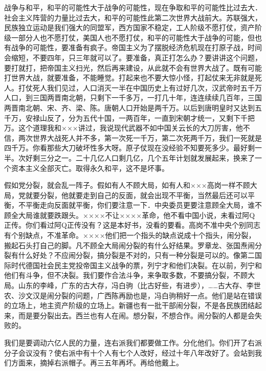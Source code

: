 战争与和平，和平的可能性大于战争的可能性，现在争取和平的可能性比过去大．社会主义阵营的力量比过去大，和平的可能性此第二次世界大战前大。苏联强大，民族独立运动是我们强大的同盟军，西方国家不稳定，工人阶级不愿打仗，资产阶级一部分人也不愿打仗，美国人也不愿打仗，和平的可能性大于战争的可能，但也有战争的可能性，要准备有疯子。帝国主义为了摆脱经济危机现在打原子战，时间会缩短，不要四年，只三年就可以了。要准备，真正打怎么办？要讲讲这个问题，要打就打，把帝国主义扫光，然后再来建设，从此就不会有世界大战了。既有可能打世界大战，就要准备，不能睡觉。打起来也不要大惊小怪，打起仗来无非就是死人。打仗死人我们见过，人口消灭一半在中国历史上有过好几次，汉武帝时五千万人口，到三国两晋南北朝，只剩下一千多万，一打几十年，连连续续几百年，三国两晋南北朝、宋、齐、梁、陈。唐朝人口开始是两千万。以后到唐明皇时又达到五千万，安禄山反了，分为五代十国，一两百年，一直到宋朝才统一，又剩下千把万。这个道理我和×××讲过，我说现代武器不如中国关云长的大刀厉害，他不信，两次世界大战死人并不多，第一次死一千万，第二次死两千万，我们一死就是四千万。你看那些大刀破坏性多大呀。原子仗现在没经验不知要死多少。最好剩一半。次好剩三分之一。二十几亿人口剩几亿，几个五年计划就发展起来，换来了一个资本主义全部灭亡。取得永久和平，这不是坏事。

假如党分裂，就会乱一阵子。假如有人不顾大局，如有人和×××高岗一样不顾大局，党就要分裂，他就要走到自己的反面，就会出现不平衡，当然最后还可以平衡，不平衡走向反面就平衡，你们要注意一下．中央委员更要注意顾全大局，谁不顾全大局谁就要跌跟头。××××不让××××革命，他不看中国小说，未看过阿Q正传。你们看过阿Q正传没有？这是本好书，没看的要看。高岗不准中央个别同志有个别缺点，不准革命。××××他们把一个指头的缺点说成十个指头，闹分裂，搬起石头打自己的脚。凡不顾全大局闹分裂的有什么好结果。罗章龙、张国焘闹分裂有什么好处？不应闹分裂，搞分裂是不对的，只有一种分裂是可以的。像第二国际时代德国社会民主党投帝国主义战争的票，列宁才和他们决裂。在以前，列宁和他们有斗争，但不决裂。我们要作合法斗争，来争取多数，不要搞分裂，不顾大局。山东的李峰，广东的古大存，冯白驹（比古好些，有进步），……古大存、李世农、沙文汉是闹分裂的问题，广西陈再励也是，冯白驹稍好一点。他们是站在错误的立场上，地主资产阶级的立场上。新疆也有一批干部闹分裂，不是各民族团结起来，而是要分裂出去。西兰也有人在闹。想分裂，不想合作。闹分裂的人都是会失败的。

我们是要调动六亿人民的力量，连右派我们都要做工作。分化他们。你们开了右派分子会议没有？使右派中有十个人有七个人改好，经过十年八年改好了。会站到我们方面来，摘掉右派帽子。再三五年再坏。再给他戴上。



